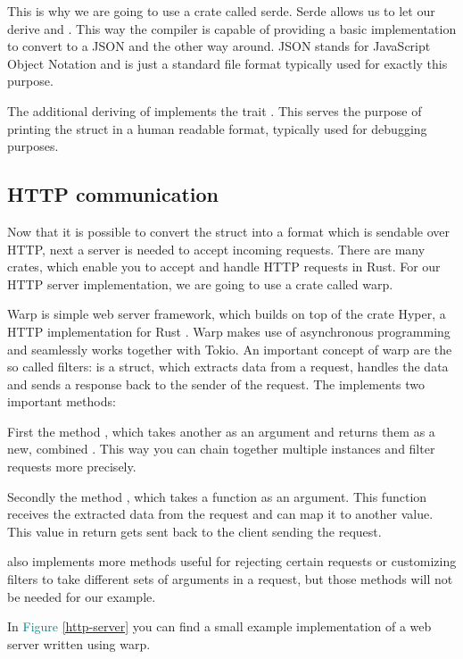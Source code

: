 This is why we are going to use a crate called serde. Serde allows us to let our  derive 
and . This way the compiler is capable of providing a basic implementation to convert  to
a JSON  and the other way around. JSON stands for JavaScript Object Notation and is just a standard file
format typically used for exactly this purpose.

The additional deriving of  implements the trait . This serves the purpose of
printing the struct in a human readable format, typically used for debugging purposes.

\subsection{HTTP communication}
Now that it is possible to convert the struct into a format which is sendable over HTTP, next a server is needed to
accept incoming requests. There are many crates, which enable you to accept and handle HTTP requests in Rust. For our
HTTP server implementation, we are going to use a crate called warp.

Warp is simple web server framework, which builds on top of the crate Hyper, a HTTP implementation for Rust
\cite{warp-doc}. Warp makes use of asynchronous programming and seamlessly works together with Tokio. An important
concept of warp are the so called filters:  is a struct, which extracts data from a request, handles
the data and sends a response back to the sender of the request. The  implements two important methods:

First the method , which takes another  as an argument and returns
them as a new, combined . This way you can chain together multiple  instances and filter
requests more precisely.

Secondly the method , which takes a function as an argument. This function receives the extracted data from
the request and can map it to another value. This value in return gets sent back to the client sending the request.

 also implements more methods useful for rejecting certain requests or customizing filters to take
different sets of arguments in a request, but those methods will not be needed for our example.

In \textcolor{teal}{Figure \ref{http-server}} you can find a small example implementation of a web server written using warp.

